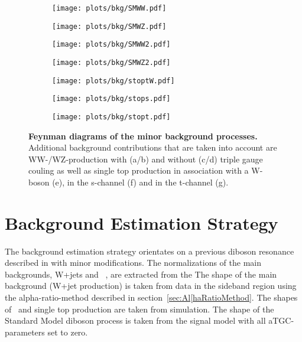\begin{figure}
	\centering
	\begin{subfigure}{0.4\textwidth}
		\texttt{[image: plots/bkg/SMWW.pdf]}
		\caption{}
		\label{fig:bkg:fy_WWtgc}
	\end{subfigure}
	\begin{subfigure}{0.4\textwidth}
		\texttt{[image: plots/bkg/SMWZ.pdf]}
		\caption{}
		\label{fig:bkg:fy_WZtgc}
	\end{subfigure}
	\begin{subfigure}{0.4\textwidth}
		\texttt{[image: plots/bkg/SMWW2.pdf]}
		\caption{}
		\label{fig:bkg:fy_WWSM}
	\end{subfigure}
	\begin{subfigure}{0.4\textwidth}
		\texttt{[image: plots/bkg/SMWZ2.pdf]}
		\caption{}
		\label{fig:bkg:fy_WZSM}
	\end{subfigure}
	\begin{subfigure}{0.3\textwidth}
		\texttt{[image: plots/bkg/stoptW.pdf]}
		\caption{}
		\label{fig:bkg:fy_stoptw}
	\end{subfigure}
	\begin{subfigure}{0.4\textwidth}
		\texttt{[image: plots/bkg/stops.pdf]}
		\caption{}
		\label{fig:bkg:fy_stops}
	\end{subfigure}
	\begin{subfigure}{\textwidth}
		\centering
		\texttt{[image: plots/bkg/stopt.pdf]}
		\caption{}
		\label{fig:bkg:fy_stopt}
	\end{subfigure}

	
	\caption[Feynman diagrams of the minor background processes.]{\textbf{Feynman diagrams of the minor background processes.} Additional background contributions that are taken into account are WW-/WZ-production with (a/b) and without (c/d) triple gauge couling as well as single top production in association with a W-boson (e), in the s-channel (f) and in the t-channel (g).}
\end{figure}

\clearpage
\section{Background Estimation Strategy}
The background estimation strategy orientates on a previous diboson resonance described in \cite{resonancepas} with minor modifications. The normalizations of the main backgrounds, W+jets and \ttbar \ , are extracted from the The shape of the main background (W+jet production) is taken from data in the sideband region using the alpha-ratio-method described in section~\ref{sec:Al[haRatioMethod}. The shapes of \ttbar \ and single top production are taken from simulation. The shape of the Standard Model diboson process is taken from the signal model with all aTGC-parameters set to zero.

